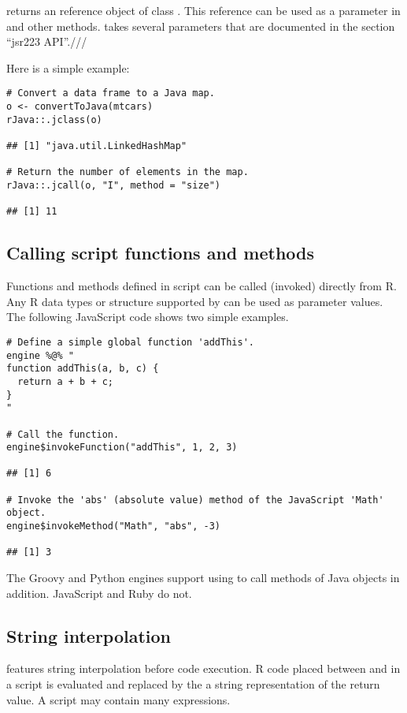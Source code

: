  returns an  reference object of class . This reference can be used as a parameter in  and other  methods.  takes several parameters that are documented in the section “jsr223 API”.///

Here is a simple  example:

\begin{verbatim}
# Convert a data frame to a Java map.
o <- convertToJava(mtcars)
rJava::.jclass(o)

## [1] "java.util.LinkedHashMap"

# Return the number of elements in the map.
rJava::.jcall(o, "I", method = "size")

## [1] 11
\end{verbatim}

\subsection{Calling script functions and methods}

Functions and methods defined in script can be called (invoked) directly from R. Any R data types or structure supported by  can be used as parameter values. The following JavaScript code shows two simple examples. 

\begin{verbatim}
# Define a simple global function 'addThis'.
engine %@% "
function addThis(a, b, c) {
  return a + b + c;
}
"

# Call the function.
engine$invokeFunction("addThis", 1, 2, 3)

## [1] 6

# Invoke the 'abs' (absolute value) method of the JavaScript 'Math' object.
engine$invokeMethod("Math", "abs", -3)

## [1] 3
\end{verbatim}

 The Groovy and Python engines support using  to call methods of Java objects in addition. JavaScript and Ruby do not.

\subsection{String interpolation}

 features string interpolation before code execution. R code placed between  and \code{\}} in a script is evaluated and replaced by the a string representation of the return value. A script may contain many  expressions.

